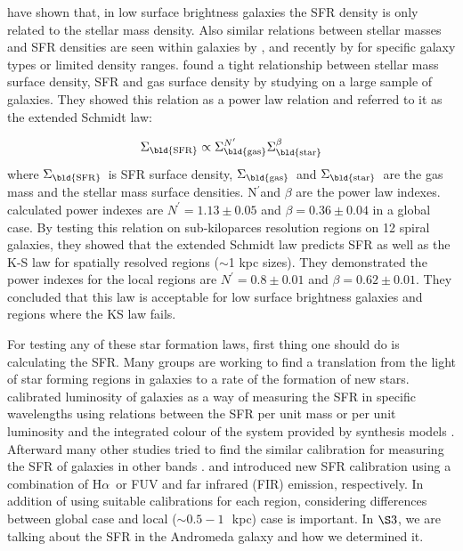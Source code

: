 \documentclass[useAMS,usenatbib]{mn2e}
\newcommand \kpc        {\,{\rm kpc}}
\newcommand \sigmagas    {$\Sigma_{\rm \bld {gas }}$\ }
\newcommand \eqsigmagas    {\Sigma_{\rm \bld {gas }}}
\newcommand \sigmasfr     {$\Sigma_{\rm \bld {SFR }}$\ }
\newcommand \eqsigmasfr     {\Sigma_{\rm \bld {SFR }}}
\newcommand \sigmastar    {$\Sigma_{\rm \bld {star }}$\ }
\newcommand \eqsigmastar    {\Sigma_{\rm \bld {star }}}
\newcommand \halpha    {H$\alpha $\ }
\newcommand \nprime {N$^\prime$}
\newcommand \eqnprime {N^\prime}
\begin{document}
\cite{Hunter98} have shown that, in low surface brightness galaxies the SFR density is only related to the stellar mass density. Also similar relations between stellar masses and SFR densities are seen within galaxies by \cite{Ryder94}, \cite{Hunter04} and recently by \cite{Leroy08} for specific galaxy types or limited density ranges. \cite{Shi11} found a tight relationship between stellar mass surface density, SFR and gas surface density by studying on a large sample of galaxies. They showed this relation as a power law relation and referred to it as the extended Schmidt law:

\begin{equation}
\label{equ:es_org}
\eqsigmasfr \propto \eqsigmagas^{\eqnprime} \eqsigmastar^{\beta}
\end{equation}
where \sigmasfr is SFR surface density, \sigmagas and \sigmastar are the gas mass and the stellar mass surface densities. \nprime and $\beta$ are the power law indexes. \cite{Shi11} calculated power indexes are $\eqnprime = 1.13 \pm 0.05$ and $\beta = 0.36\pm0.04$ in a global case. By testing this relation on sub-kiloparces resolution regions on 12 spiral galaxies, they showed that the extended Schmidt law predicts SFR as well as the K-S law for spatially resolved regions ($\sim$1 kpc sizes). They demonstrated the power indexes for the local regions are $\eqnprime = 0.8 \pm 0.01$ and $\beta = 0.62\pm0.01$. They concluded that this law is acceptable for low surface brightness galaxies and regions where the KS law fails.

For testing any of these star formation laws, first thing one should do is calculating the SFR. Many groups are working to find a translation from the light of star forming regions in galaxies to a rate of the formation of new stars. \cite{Kennicutt98b} calibrated luminosity of galaxies as a way of measuring the SFR in specific wavelengths using relations between the SFR per unit mass or per unit luminosity and the integrated colour of the system provided by synthesis models  \citep[e.g.,][]{Bruzual93}. Afterward many other studies tried to find the similar calibration for measuring the SFR of galaxies in other bands \citep[e.g.,][]{Kennicutt12, Calzetti13, Zhu08, Kennicutt09, Boquien10, Boquien11, Hao11}. \cite{Kennicutt09} and \cite{Hao11} introduced new SFR calibration using a combination of \halpha or FUV and far infrared (FIR) emission, respectively. In addition of using suitable calibrations for each region, considering differences between global case and local ($\sim 0.5-1$~\kpc) case is important. In $\S3$, we are talking about the SFR in the Andromeda galaxy and how we determined it.
\end{document}
